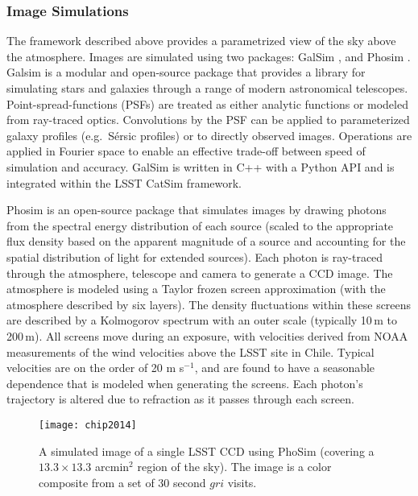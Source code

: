 \subsubsection{Image Simulations}
\label{sec:imsim}

The framework described above provides a parametrized view of the sky
above the atmosphere. Images are simulated using two packages: GalSim
\citep{2015A&C....10..121R}, and Phosim \citep{2015ApJS..218...14P}. Galsim is a
modular and open-source package that provides a library for simulating
stars and galaxies through a range of modern astronomical
telescopes. Point-spread-functions (PSFs) are treated as either
analytic functions or modeled from ray-traced optics. Convolutions by
the PSF can be applied to parameterized galaxy profiles (e.g.\
S\'ersic profiles) or to directly observed images. Operations are
applied in Fourier space to enable an effective trade-off between
speed of simulation and accuracy. GalSim is written in C++ with a
Python API and is integrated within the LSST CatSim framework.

Phosim is an open-source package that simulates images by drawing
photons from the spectral energy distribution of each source (scaled
to the appropriate flux density based on the apparent magnitude of a
source and accounting for the spatial distribution of light for
extended sources). Each photon is ray-traced through the atmosphere,
telescope and camera to generate a CCD image. The atmosphere is
modeled using a Taylor frozen screen approximation (with the
atmosphere described by six layers). The density fluctuations within
these screens are described by a Kolmogorov spectrum with an outer
scale (typically 10\,m to 200\,m). All screens move during an exposure,
with velocities derived from NOAA measurements of the wind velocities
above the LSST site in Chile.  Typical velocities are on the order of
20 m s$^{-1}$, and are found to have a seasonable dependence that is
modeled when generating the screens. Each photon's trajectory is
altered due to refraction as it passes through each screen.


\begin{figure*}
\centerline{\texttt{[image: chip2014]}}
\caption{ A simulated image of a single LSST CCD using PhoSim
  (covering a $13.3\times13.3$ arcmin$^2$ region of the sky). The
  image is a color composite \citep{2004PASP..116..133L} from a set of 30
  second $gri$ visits.}
\label{Fig:ImSimExample}
\end{figure*}

